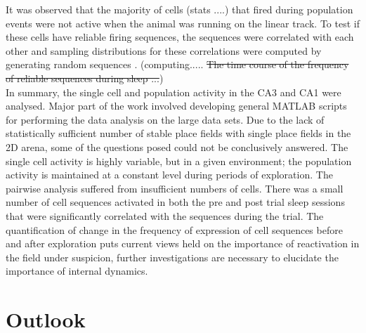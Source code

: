 It was observed that the majority of cells (stats ....) that fired during population events were not active when the animal was running on the linear track. To test if these cells have reliable firing sequences, the sequences were correlated with each other and sampling distributions for these correlations were computed by generating random sequences \cite{Nadasdy1999}. (computing..... \st{The time course of the frequency of reliable sequences during sleep ...})\\

In summary, the single cell and population activity in the CA3 and CA1 were analysed. Major part of the work involved developing general MATLAB scripts for performing the data analysis on the large data sets. Due to the lack of statistically sufficient number of stable place fields with single place fields in the 2D arena, some of the questions posed could not be conclusively answered. The single cell activity is highly variable, but in a given environment; the population activity is maintained at a constant level during periods of exploration. The pairwise analysis suffered from insufficient numbers of cells. There was a small number of cell sequences activated in both the pre and post trial sleep sessions that were significantly correlated with the sequences during the trial. The quantification of change in the frequency of expression of cell sequences before and after exploration puts current views held on the importance of reactivation in the field under suspicion, further investigations are necessary to elucidate the importance of internal dynamics. 

\section*{Outlook}




